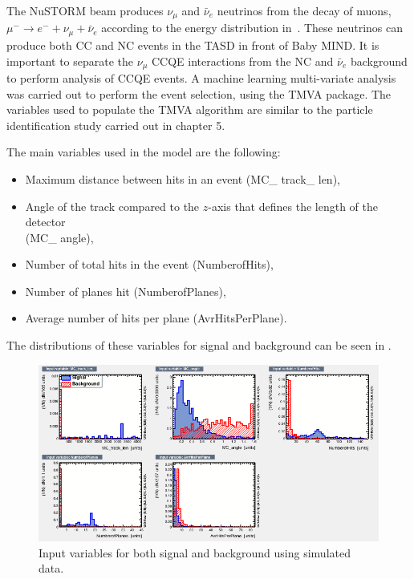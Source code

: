 The NuSTORM beam produces $\nu_\mu$ and $\bar{\nu}_e$ neutrinos from the decay of muons, $ \mu^- \rightarrow e^- + \nu_\mu + \bar{\nu}_e $ according to the energy distribution in~. These neutrinos can produce both CC and NC events in the TASD in front of Baby MIND. It is important to separate the $\nu_\mu$ CCQE interactions from the NC and $\bar{\nu}_e$ background to perform analysis of CCQE events. A machine learning multi-variate analysis was carried out to perform the event selection, using the TMVA package. The variables used to populate the TMVA algorithm are similar to the particle identification study carried out in chapter 5.


The main variables used in the model are the following:
\begin{itemize}
\item Maximum distance between hits in an event (MC\_ track\_ len),
\item Angle of the track compared to the $z$-axis that defines the length of the detector\\ (MC\_ angle),
\item Number of total hits in the event (NumberofHits),
\item Number of planes hit (NumberofPlanes),
\item Average number of hits per plane (AvrHitsPerPlane).
\end{itemize}

The distributions of these variables for signal and background can be seen in .


\begin{figure}[h!]
\centering

\includegraphics[width=\textwidth]{figures/neutrinoTMVA/variables_id_c1.png}
\caption{Input variables for both signal and background using simulated data.}
\label{fig:TMVANeuinput}
\end{figure}

